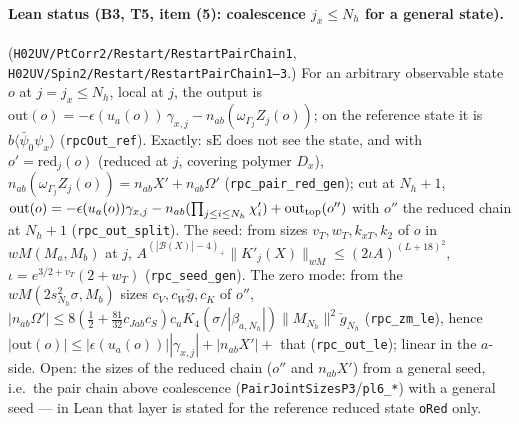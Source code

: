 \documentclass[11pt]{amsart}
\theoremstyle{definition}
\theoremstyle{remark}
\numberwithin{equation}{section}
\begin{document}
\paragraph{Lean status (B3, T5, item (5): coalescence $j_x\le N_h$ for a general state).}
(\texttt{H02UV/PtCorr2/Restart/RestartPairChain1}, \texttt{H02UV/Spin2/Restart/RestartPairChain1--3}.) For an arbitrary observable state $o$ at
$j=j_x\le N_h$, local at $j$, the output is $\mathrm{out}(o)=-\epsilon(u_a(o))\,\gamma_{x,j}-n_{ab}(\omega_{\Gamma_j}Z_j(o))$;
on the reference state it is $b\langle\bar\psi_0\psi_x\rangle$ (\texttt{rpcOut\_ref}). Exactly: $\mathrm{sE}$ does not
see the state, and with $o'=\mathrm{red}_j(o)$ (reduced at $j$, covering polymer $D_x$),
$n_{ab}(\omega_{\Gamma_j}Z_j(o))=n_{ab}X'+n_{ab}\Omega'$ (\texttt{rpc\_pair\_red\_gen}); cut at $N_h+1$,
$\mathrm{out}(o)=-\epsilon(u_a(o))\gamma_{x,j}-n_{ab}(\prod_{j\le i\le N_h}\chi'_i)+\mathrm{out}_{\rm top}(o'')$ with
$o''$ the reduced chain at $N_h+1$ (\texttt{rpc\_out\_split}). The seed: from sizes $v_T,w_T,k_{xT},k_2$ of $o$ in
$wM(M_a,M_b)$ at $j$, $A^{(|\mathcal B(X)|-4)_+}\|K'_j(X)\|_{wM}\le(2\iota A)^{(L+18)^2}$, $\iota=e^{3/2+v_T}(2+w_T)$
(\texttt{rpc\_seed\_gen}). The zero mode: from the $wM(2s_{N_h}^2\sigma,M_b)$ sizes $c_V,c_W\check g,c_K$ of $o''$,
$|n_{ab}\Omega'|\le8(\frac12+\frac{81}{32}c_{Jab}c_S)c_uK_4(\sigma/|\beta_{a,N_h}|)\|M_{N_h}\|^2\check g_{N_h}$
(\texttt{rpc\_zm\_le}), hence $|\mathrm{out}(o)|\le|\epsilon(u_a(o))||\gamma_{x,j}|+|n_{ab}X'|+$ that
(\texttt{rpc\_out\_le}); linear in the $a$-side. Open: the sizes of the reduced chain ($o''$ and $n_{ab}X'$) from a
general seed, i.e.\ the pair chain above coalescence (\texttt{PairJointSizesP3}/\texttt{pl6\_*}) with a general
seed --- in Lean that layer is stated for the reference reduced state \texttt{oRed} only.
\end{document}
